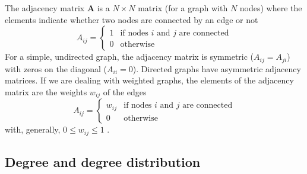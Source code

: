 \documentclass[11 pt , letterpaper , twoside , openright]{book}
\begin{document}
The adjacency matrix \textbf{A} is a $N \times N$ matrix (for a graph with $N$ nodes) where the elements indicate whether two nodes are connected by an edge or not \cite{Mata2020}
\begin{equation}
	A_{ij} = 
	\begin{cases}
		1 & \text{if nodes $i$ and $j$ are connected}\\
		0 & \text{otherwise}
	\end{cases}
\end{equation}
For a simple, undirected graph, the adjacency matrix is symmetric ($A_{ij} = A_{ji}$) with zeros on the diagonal ($A_{ii} = 0$). Directed graphs have asymmetric adjacency matrices. If we are dealing with weighted graphs, the elements of the adjacency matrix are the weights $w_{ij}$ of the edges
\begin{equation}
	A_{ij} = 
	\begin{cases}
		w_{ij} & \text{if nodes $i$ and $j$ are connected}\\
		0 & \text{otherwise}
	\end{cases}
\end{equation}
with, generally, $0 \leqslant w_{ij} \leqslant 1$ \cite{Mata2020}. \\
\subsection{Degree and degree distribution}
\end{document}
